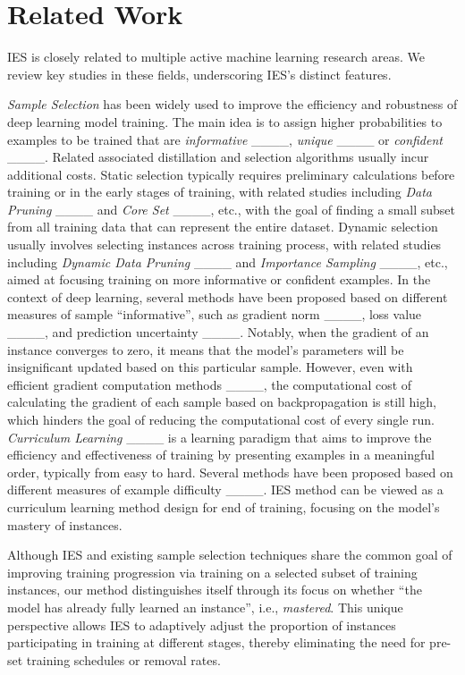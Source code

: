 \section{Related Work}
IES is closely related to multiple active machine learning research areas. We review key studies in these fields, underscoring IES's distinct features. 

\emph{Sample Selection} has been widely used to improve the efficiency and robustness of deep learning model training. The main idea is to assign higher probabilities to examples to be trained that are \emph{informative} ____, \emph{unique} ____ or \emph{confident} ____. Related associated distillation and selection algorithms usually incur additional costs. Static selection typically requires preliminary calculations before training or in the early stages of training, with related studies including \emph{Data Pruning} ____ and \emph{Core Set} ____, etc., with the goal of finding a small subset from all training data that can represent the entire dataset. 
Dynamic selection usually involves selecting instances across training process, with related studies including \emph{Dynamic Data Pruning} ____ and \emph{Importance Sampling} ____, etc., aimed at focusing training on more informative or confident examples. 
In the context of deep learning, several methods have been proposed based on different measures of sample ``informative'', such as gradient norm ____, loss value ____, and prediction uncertainty ____. 
Notably, when the gradient of an instance converges to zero, it means that the model's parameters will \textcolor{changecolor}{be} insignificant updated based on this particular sample. However, even with efficient gradient computation methods ____, the computational cost of calculating the gradient of each sample based on backpropagation is still high, which hinders the goal of reducing the computational cost of every single run. \emph{Curriculum Learning}
 ____ is a learning paradigm that aims to improve the efficiency and effectiveness of training by presenting examples in a meaningful order, typically from easy to hard. Several methods have been proposed based on different measures of example difficulty ____. IES method can be viewed as a curriculum learning method design for end of training, focusing on the model's mastery of instances.

Although IES and existing sample selection techniques share the common goal of improving training progression via training on a selected subset of training instances, our method distinguishes itself through its focus on whether ``the model has already fully learned an instance'', i.e., \emph{mastered}. This unique perspective allows IES to adaptively adjust the proportion of instances participating in training at different stages, thereby eliminating the need for pre-set training schedules or removal rates.